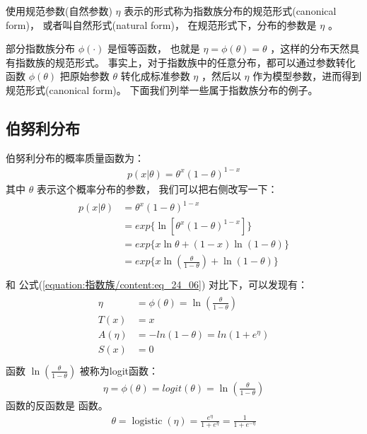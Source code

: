 \documentclass[letterpaper,10pt,english]{sphinxmanual}
\begin{document}
使用规范参数(自然参数) \(\eta\) 表示的形式称为指数族分布的规范形式(canonical form)，
或者叫自然形式(natural form)，
在规范形式下，分布的参数是 \(\eta\) 。

部分指数族分布 \(\phi(\cdot)\) 是恒等函数，
也就是 \(\eta=\phi(\theta)=\theta\) ，这样的分布天然具有指数族的规范形式。
事实上，对于指数族中的任意分布，都可以通过参数转化函数 \(\phi(\theta)\) 把原始参数 \(\theta\)
转化成标准参数 \(\eta\) ，然后以 \(\eta\) 作为模型参数，进而得到规范形式(canonical form)。
下面我们列举一些属于指数族分布的例子。


\subsection{伯努利分布}
\label{\detokenize{_u6307_u6570_u65cf/content:id3}}
伯努利分布的概率质量函数为：
\begin{equation}\label{equation:指数族/content:指数族/content:1}
\begin{split}p(x|\theta) = \theta^x(1-\theta)^{1-x}\end{split}
\end{equation}
其中 \(\theta\) 表示这个概率分布的参数，
我们可以把右侧改写一下：
\begin{align}\label{equation:指数族/content:指数族/content:2}\!\begin{aligned}
p(x|\theta) &= \theta^x(1-\theta)^{1-x}\\
&= exp \{  \ln  [ \theta^x (1-\theta)^{1-x}  ] \}\\
&= exp\{  x \ln \theta + (1-x) \ln (1-\theta)  \}\\
&= exp\{  x \ln \left( \frac{\theta}{1-\theta} \right) +  \ln (1- \theta)  \}\\
\end{aligned}\end{align}
和 公式(\ref{equation:指数族/content:eq_24_06}) 对比下，可以发现有：
\begin{align}\label{equation:指数族/content:指数族/content:3}\!\begin{aligned}
\eta &=\phi(\theta) = \ln \left( \frac{\theta}{1-\theta} \right)\\
T(x) &=x\\
A(\eta) &= - ln (1-\theta) = ln(1+e^{\eta})\\
S(x) &= 0\\
\end{aligned}\end{align}
函数 \(\ln \left( \frac{\theta}{1-\theta} \right)\) 被称为logit函数：
\begin{equation}\label{equation:指数族/content:指数族/content:4}
\begin{split}\eta=\phi(\theta)=logit(\theta)=\ln \left( \frac{\theta}{1-\theta} \right)\end{split}
\end{equation}
 函数的反函数是  函数。
\begin{equation}\label{equation:指数族/content:指数族/content:5}
\begin{split}\theta = \mathop{logistic}(\eta)=\frac{e^{\eta}}{1+e^{\eta}} = \frac{1}{1+e^{-\eta}}\end{split}
\end{equation}
\end{document}
